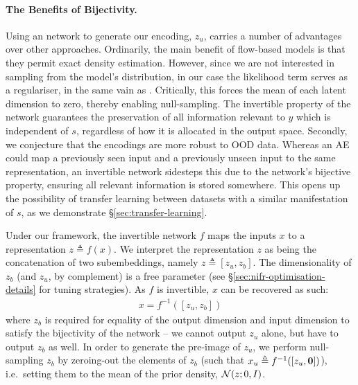 \paragraph{The Benefits of Bijectivity.}
%
Using an  network to generate our encoding, $z_u$, carries a number of advantages over other
approaches. 
%
Ordinarily, the main benefit of flow-based models is that they permit exact density estimation.
%
However, since we are not interested in sampling from the model's distribution, in our case the
likelihood term serves as a regulariser, in the same vain as \citet{JacSmeOya18}.
%
Critically, this forces the mean of each latent dimension to zero, thereby enabling null-sampling.
%
The invertible property of the network guarantees the preservation of all information relevant to
$y$ which is independent of $s$, regardless of how it is allocated in the output space. 
%
Secondly, we conjecture that the encodings are more robust to \ac{OOD} data. 
%
Whereas an \acf{AE} could map a previously seen input and a previously unseen input to the same
representation, an invertible network sidesteps this due to the network's bijective property,
ensuring all relevant information is stored somewhere. 
%
This opens up the possibility of transfer learning between datasets with a similar manifestation of
$s$, as we demonstrate \S\ref{sec:transfer-learning}.

Under our framework, the invertible network $f$ maps the inputs $x$ to a representation
$z \triangleq f(x)$.
%
We interpret the representation $z$ as being the concatenation of two subembeddings, namely \( z
\triangleq [z_u, z_b] \). 
%
The dimensionality of $z_b$ (and $z_u$, by complement) is a free parameter (see
\S\ref{sec:nifr-optimisation-details} for tuning strategies). 
%
As $f$ is invertible, $x$ can be recovered as such:
%
\begin{align}
  x = f^{-1}([z_u, z_b])
  \label{eq:zreconstruct}
\end{align}
%
where $z_b$ is required for equality of the output dimension and input dimension to satisfy
the bijectivity of the network -- we cannot output $z_u$ alone, but have to output $z_b$
as well. 
%
In order to generate the pre-image of $z_u$, we perform null-sampling \wrt{} $z_b$ by zeroing-out
the elements of $z_b$ (such that $x_u \triangleq f^{-1}([z_{u}, {\bm{0}}])$), i.e.\ setting them to
the mean of the prior density, ${\mathcal{N}}(z;0, I)$.

